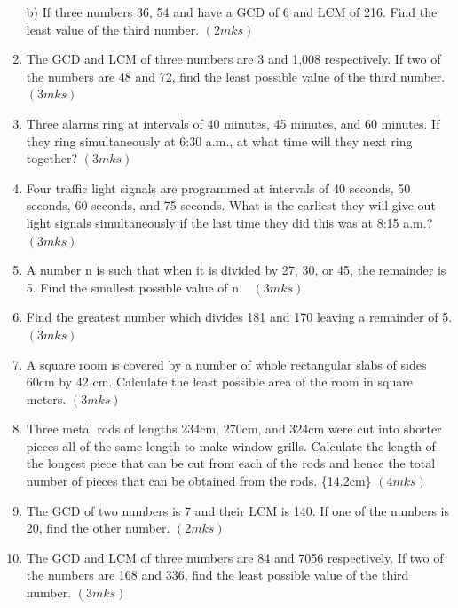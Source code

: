 \documentclass[
  a4paperpaper,
]{scrbook}
\begin{document}
\begin{tcolorbox}
\begin{enumerate}
  b) If three numbers 36, 54 and have a GCD of 6 and LCM of 216. Find
  the least value of the third number. \hspace{11.1cm} \((2mks)\)
\item
  The GCD and LCM of three numbers are 3 and 1,008 respectively. If two
  of the numbers are 48 and 72, find the least possible value of the
  third number.\hspace{5cm} \((3mks)\)
\item
  Three alarms ring at intervals of 40 minutes, 45 minutes, and 60
  minutes. If they ring simultaneously at 6:30 a.m., at what time will
  they next ring together? \hspace{3.9cm} \((3mks)\)
\item
  Four traffic light signals are programmed at intervals of 40 seconds,
  50 seconds, 60 seconds, and 75 seconds. What is the earliest they will
  give out light signals simultaneously if the last time they did this
  was at 8:15 a.m.? \hspace{8.5cm} \((3mks)\)
\item
  A number n is such that when it is divided by 27, 30, or 45, the
  remainder is 5. Find the smallest possible value of n.~\hspace{11cm}
  \((3mks)\)
\item
  Find the greatest number which divides 181 and 170 leaving a remainder
  of 5. \hspace{1.7cm} \((3mks)\)
\item
  A square room is covered by a number of whole rectangular slabs of
  sides 60cm by 42 cm. Calculate the least possible area of the room in
  square meters. \hspace{4cm} \((3mks)\)
\item
  Three metal rods of lengths 234cm, 270cm, and 324cm were cut into
  shorter pieces all of the same length to make window grills. Calculate
  the length of the longest piece that can be cut from each of the rods
  and hence the total number of pieces that can be obtained from the
  rods. \hspace*\{14.2cm\} \((4mks)\)
\item
  The GCD of two numbers is 7 and their LCM is 140. If one of the
  numbers is 20, find the other number. \hspace{12.8cm} \((2mks)\)
\item
  The GCD and LCM of three numbers are 84 and 7056 respectively. If two
  of the numbers are 168 and 336, find the least possible value of the
  third number.\hspace{5cm} \((3mks)\)

\end{enumerate}
\end{tcolorbox}
\end{document}
